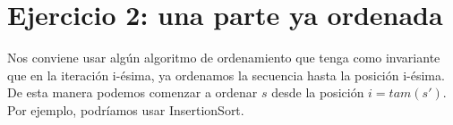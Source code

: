 \section{Ejercicio 2: una parte ya ordenada}

Nos conviene usar algún algoritmo de ordenamiento que tenga como invariante que en la iteración i-ésima, ya ordenamos la secuencia hasta la posición i-ésima. De esta manera podemos comenzar a ordenar $s$ desde la posición $i=tam(s')$. Por ejemplo, podríamos usar InsertionSort.
